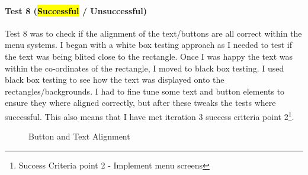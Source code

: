 \documentclass[12pt]{report}
\begin{document}
\paragraph{Test 8 (\hl{Successful} / Unsuccessful)}
Test 8 was to check if the alignment of the text/buttons are all correct within the menu systems. I began with a white box testing approach as I needed to test if the text was being blited close to the rectangle. Once I was happy the text was within the co-ordinates of the rectangle, I moved to black box testing. I used black box testing to see how the text was displayed onto the rectangles/backgrounds. I had to fine tune some text and button elements to ensure they where aligned correctly, but after these tweaks the tests where successful. This also means that I have met iteration 3 success criteria point 2\footnote{Success Criteria point 2 - Implement menu screens}.

 \begin{figure}[H]
    \caption{Button and Text Alignment}
\end{figure}

\pagebreak
\end{document}
